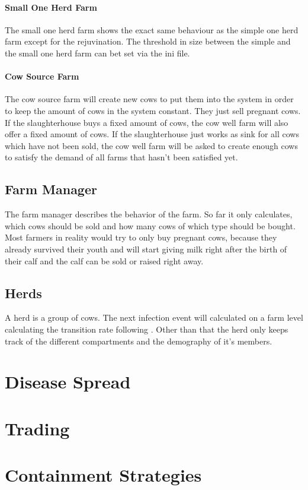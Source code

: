 \paragraph{Small One Herd Farm}
The small one herd farm shows the exact same behaviour as the simple one herd farm except for the rejuvination. The threshold in size between the simple and the small one herd farm can bet set via the ini file. 
\paragraph{Cow Source Farm}
The cow source farm will create new cows to put them into the system in order to keep the amount of cows in the system constant. They just sell pregnant cows. If the slaughterhouse buys a fixed amount of cows, the cow well farm will also offer a fixed amount of cows. If the slaughterhouse just works as sink for all cows which have not been sold, the cow well farm will be asked to create enough cows to satisfy the demand of all farms that hasn't been satisfied yet.
\subsection{Farm Manager}
The farm manager describes the behavior of the farm. So far it only calculates, which cows should be sold and how many cows of which type should be bought. Most farmers in reality would try to only buy pregnant cows, because they already survived their youth and will start giving milk right after the birth of their calf and the calf can be sold or raised right away.
\subsection{Herds}
A herd is a group of cows. The next infection event will calculated on a farm level calculating the transition rate following \citep{VIE04}. Other than that the herd only keeps track of the different compartments and the demography of it's members.
\section{Disease Spread}
\section{Trading}
\section{Containment Strategies}
